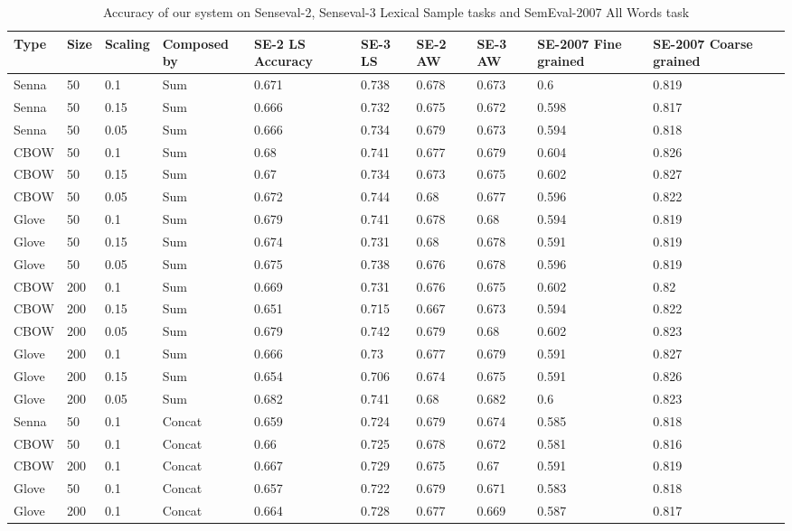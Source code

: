 \begin{table}
	\caption{Accuracy of our system on Senseval-2, Senseval-3 Lexical Sample tasks and SemEval-2007 All Words task}
	\label{table:full}
	\begin{center}
\begin{tabular}{|p{1cm}|p{0.5cm}|p{1cm}|p{1cm}|p{2cm}|p{2cm}|p{1.5cm}|p{1.5cm}|p{1.5cm}|p{2cm}|p{2cm}|}
Type & Size & Scaling & Composed by& SE-2 LS Accuracy & SE-3 LS & SE-2 AW & SE-3 AW & SE-2007 Fine grained & SE-2007 Coarse grained &\\
\hline
Senna&50&0.1&Sum&0.671&0.738&0.678&0.673&0.6&0.819 &\\
\hline
Senna&50&0.15&Sum&0.666&0.732&0.675&0.672&0.598&0.817 &\\
\hline
Senna&50&0.05&Sum&0.666&0.734&0.679&0.673&0.594&0.818 &\\
\hline
CBOW&50&0.1&Sum&0.68&0.741&0.677&0.679 &0.604 & 0.826\\
\hline
CBOW&50&0.15&Sum&0.67&0.734&0.673&0.675&0.602&0.827\\
\hline
CBOW&50&0.05&Sum&0.672&0.744&0.68&0.677&0.596&0.822\\
\hline
Glove&50&0.1&Sum&0.679&0.741&0.678&0.68&0.594&0.819 &\\
\hline
Glove&50&0.15&Sum&0.674&0.731&0.68&0.678&0.591&0.819 &\\
\hline
Glove&50&0.05&Sum&0.675&0.738&0.676&0.678&0.596&0.819 &\\
\hline
CBOW&200&0.1&Sum&0.669&0.731&0.676&0.675&0.602&0.82 &\\
\hline
CBOW&200&0.15&Sum&0.651&0.715&0.667&0.673&0.594&0.822 &\\
\hline
CBOW&200&0.05&Sum&0.679&0.742&0.679&0.68&0.602&0.823 &\\
\hline
Glove&200&0.1&Sum&0.666&0.73&0.677&0.679&0.591&0.827 &\\
\hline
Glove&200&0.15&Sum&0.654&0.706&0.674&0.675&0.591&0.826 &\\
\hline
Glove&200&0.05&Sum&0.682&0.741&0.68&0.682&0.6&0.823 &\\
\hline
Senna&50&0.1&Concat&0.659&0.724&0.679&0.674&0.585&0.818 &\\
\hline
CBOW&50&0.1&Concat&0.66&0.725&0.678&0.672&0.581&0.816&\\
\hline
CBOW&200&0.1&Concat&0.667&0.729&0.675&0.67&0.591&0.819&\\
\hline
Glove&50&0.1&Concat&0.657&0.722&0.679&0.671&0.583&0.818&\\
\hline
Glove&200&0.1&Concat&0.664&0.728&0.677&0.669&0.587&0.817&\\
\hline
\end{tabular}
	\end{center}
\end{table}

